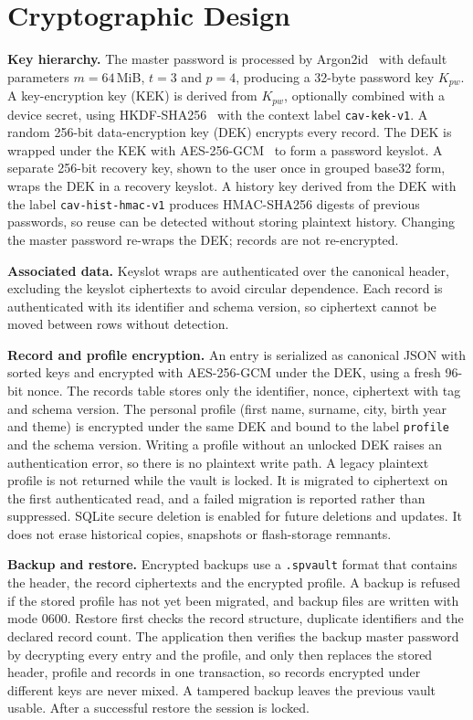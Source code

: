 \documentclass[conference]{IEEEtran}
\begin{document}
\section{Cryptographic Design}
\textbf{Key hierarchy.} The master password is processed by Argon2id~\cite{rfc9106} with default parameters $m=64$\,MiB, $t=3$ and $p=4$, producing a 32-byte password key $K_{pw}$. A key-encryption key (KEK) is derived from $K_{pw}$, optionally combined with a device secret, using HKDF-SHA256~\cite{rfc5869} with the context label \texttt{cav-kek-v1}. A random 256-bit data-encryption key (DEK) encrypts every record. The DEK is wrapped under the KEK with AES-256-GCM~\cite{gcm} to form a password keyslot. A separate 256-bit recovery key, shown to the user once in grouped base32 form, wraps the DEK in a recovery keyslot. A history key derived from the DEK with the label \texttt{cav-hist-hmac-v1} produces HMAC-SHA256 digests of previous passwords, so reuse can be detected without storing plaintext history. Changing the master password re-wraps the DEK; records are not re-encrypted.

\textbf{Associated data.} Keyslot wraps are authenticated over the canonical header, excluding the keyslot ciphertexts to avoid circular dependence. Each record is authenticated with its identifier and schema version, so ciphertext cannot be moved between rows without detection.

\textbf{Record and profile encryption.} An entry is serialized as canonical JSON with sorted keys and encrypted with AES-256-GCM under the DEK, using a fresh 96-bit nonce. The records table stores only the identifier, nonce, ciphertext with tag and schema version. The personal profile (first name, surname, city, birth year and theme) is encrypted under the same DEK and bound to the label \texttt{profile} and the schema version. Writing a profile without an unlocked DEK raises an authentication error, so there is no plaintext write path. A legacy plaintext profile is not returned while the vault is locked. It is migrated to ciphertext on the first authenticated read, and a failed migration is reported rather than suppressed. SQLite secure deletion is enabled for future deletions and updates. It does not erase historical copies, snapshots or flash-storage remnants.

\textbf{Backup and restore.} Encrypted backups use a \texttt{.spvault} format that contains the header, the record ciphertexts and the encrypted profile. A backup is refused if the stored profile has not yet been migrated, and backup files are written with mode 0600. Restore first checks the record structure, duplicate identifiers and the declared record count. The application then verifies the backup master password by decrypting every entry and the profile, and only then replaces the stored header, profile and records in one transaction, so records encrypted under different keys are never mixed. A tampered backup leaves the previous vault usable. After a successful restore the session is locked.
\end{document}

